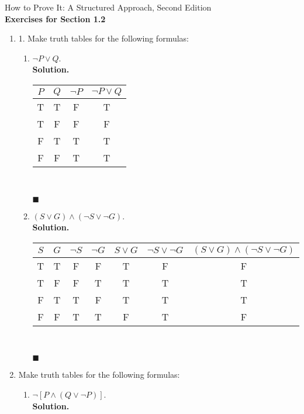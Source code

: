 \documentclass{report}
\newcommand{\sol}{\vspace{1em}\\\textbf{Solution.}\vspace{0.5em}}
\newcommand{\qed}{\ \\\strut\hfill$\blacksquare$\vspace{1em}}
\begin{document}
\begin{center}
    \Large{How to Prove It: A Structured Approach, Second Edition}\\
    \vspace{1em}
    \Large{\textbf{Exercises for Section 1.2}}\vspace{1em}
\end{center}
\begin{enumerate}[leftmargin=*]
    \item 1. Make truth tables for the following formulas:
          \begin{enumerate}
              \item $\neg P \vee Q$. \sol{}
                    \begin{center}
                        \begin{tabular}{cccc}
                            $P$ & $Q$ & $\neg P$ & $\neg P \vee Q$ \\
                            \hline
                            T   & T   & F        & T               \\
                            T   & F   & F        & F               \\
                            F   & T   & T        & T               \\
                            F   & F   & T        & T
                        \end{tabular}
                    \end{center}\qed

              \item $(S \vee G) \wedge(\neg S \vee \neg G)$.\sol{}
                    \begin{center}
                        \begin{tabular}{ccccccc}
                            $S$ & $G$ & $\neg S$ & $\neg G$ & $S \vee G$ & $\neg S \vee \neg G$ & $(S \vee G) \wedge(\neg S \vee \neg G)$ \\
                            \hline
                            T   & T   & F        & F        & T          & F                    & F                                       \\
                            T   & F   & F        & T        & T          & T                    & T                                       \\
                            F   & T   & T        & F        & T          & T                    & T                                       \\
                            F   & F   & T        & T        & F          & T                    & F
                        \end{tabular}
                    \end{center}\qed
          \end{enumerate}
    \item Make truth tables for the following formulas:
          \begin{enumerate}
              \item $\neg[P \wedge(Q \vee \neg P)]$. \sol{}


\end{enumerate}
\end{enumerate}
\end{document}
